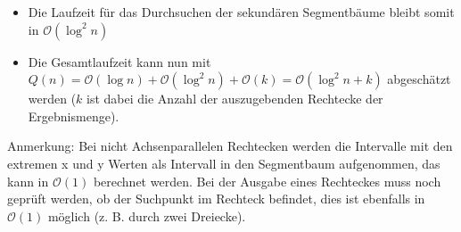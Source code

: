 \documentclass[a4paper]{article}
\begin{document}
\begin{itemize}
	\item Die Laufzeit für das Durchsuchen der sekundären Segmentbäume bleibt somit in 
	 $\mathcal{O}(\log^2 n)$
	
\item Die Gesamtlaufzeit kann nun mit $Q(n) = \mathcal{O}(\log n) + \mathcal{O}(\log^2 n) + \mathcal{O}(k)
= \mathcal{O}(\log^2 n + k)$ abgeschätzt werden ($k$ ist dabei die Anzahl der auszugebenden Rechtecke
der Ergebnismenge).
\end{itemize}

Anmerkung: Bei nicht Achsenparallelen Rechtecken werden die Intervalle mit den extremen x und y Werten als Intervall in den Segmentbaum aufgenommen, das kann in $\mathcal{O}(1)$ berechnet werden. Bei der Ausgabe eines Rechteckes muss noch geprüft werden, ob der Suchpunkt im Rechteck befindet, dies ist ebenfalls in $\mathcal{O}(1)$ möglich (z. B. durch zwei Dreiecke).
\end{document}

